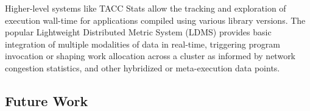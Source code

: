Higher-level systems like TACC Stats \cite{evans2014comprehensive}
allow the tracking and exploration of execution wall-time for
applications compiled using various library versions.
%
The popular Lightweight Distributed Metric System (LDMS)
\cite{agelastos2014lightweight} provides basic integration of multiple
modalities of data in real-time, triggering program invocation or
shaping work allocation across a cluster as informed by network
congestion statistics, and other hybridized or meta-execution data
points.




\subsection{Future Work}

